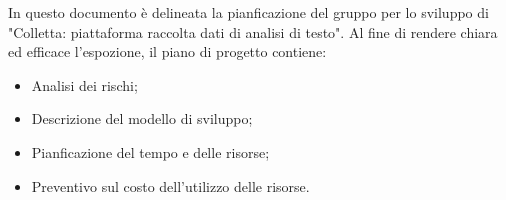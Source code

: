 In questo documento è delineata la pianficazione del gruppo \gruppo \space per lo sviluppo
di "Colletta: piattaforma raccolta dati di analisi di testo". \newline
Al fine di rendere chiara ed efficace l'espozione, il piano di progetto contiene:
\begin{itemize}
    \item Analisi dei rischi;
    \item Descrizione del modello di sviluppo;
    \item Pianficazione del tempo e delle risorse;
    \item Preventivo sul costo dell'utilizzo delle risorse.
\end{itemize}